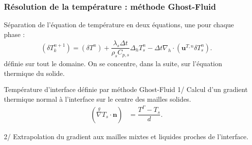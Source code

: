 \documentclass{beamer}
\newcommand{\inte}{\Gamma}
\newcommand{\vect}[1]{\bm{#1}}
\newcommand{\norm}{\vect{n}}
\newcommand{\npl}{{n+1}}
\newcommand{\ghost}{\overset{{g}}{\nabla}}
\renewcommand{\frac}{\dfrac}
\begin{document}
\begin{frame}
    \frametitle{Résolution de la température : méthode Ghost-Fluid}
    	\footnotesize
\begin{ceablock}{Séparation de l'équation de température en deux équations, une pour chaque phase :}
\begin{align}
 (\delta T_k^\npl)   = (\delta T^n) + \frac{\lambda_s \Delta t }{\rho_s C_{p,s}}  \Delta_h T_s^n - \Delta t \nabla_h \cdot ( \vect{u}^{T,n} \delta T_s^n).
\end{align}
définie sur tout le domaine. On se concentre, dans la suite, sur l'équation thermique  du solide.
\end{ceablock}

\begin{ceablock}{Température d'interface définie par méthode Ghost-Fluid}
1/ Calcul d'un gradient thermique normal à l'interface sur le centre des mailles solides.
\begin{align}
 (\ghost T_s \cdot \norm) &= \frac{T^\inte - T_s}{d}.
\end{align}
\end{ceablock}
2/ Extrapolation du gradient aux mailles mixtes et liquides proches de l'interface.
\begin{center}
		\begin{tikzpicture}[scale = 0.65, every node/.style={scale=0.65}]
			
		\end{tikzpicture}

\end{center}
\end{frame}
\end{document}
